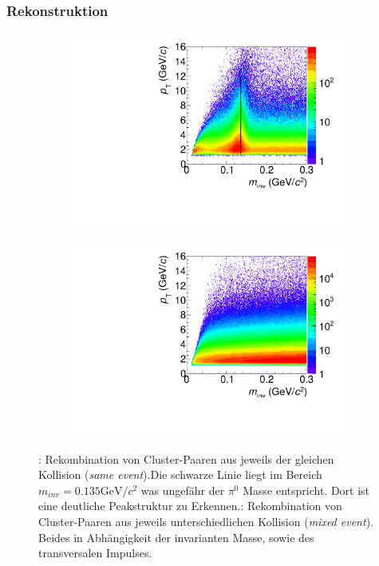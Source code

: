 \documentclass[]{article}
\begin{document}
	
	\subsubsection{Rekonstruktion}
	\begin{figure}[tbp]
		\centering
		\begin{subfigure}{.5\textwidth}
			\centering
			\includegraphics[width=.95\linewidth]{hInvMass_pT_Signal.pdf}
			\caption{}
			\label{figInvMassPt_a}
		\end{subfigure}%
		\begin{subfigure}{.5\textwidth}
			\centering
			\includegraphics[width=.95\linewidth]{hInvMass_pT_Bkg.pdf}
			\caption{}
			\label{figInvMassPt_b}
		\end{subfigure}
		\caption{: Rekombination von Cluster-Paaren aus jeweils der gleichen Kollision ({\it same event}).Die schwarze Linie liegt im Bereich $m_{inv}=0.135\text{GeV/}c^{2}$ was ungef{\"a}hr der $\pi^{0}$ Masse entspricht. Dort ist eine deutliche Peakstruktur zu Erkennen.: Rekombination von Cluster-Paaren aus jeweils unterschiedlichen Kollision ({\it mixed event}). Beides in Abh{\"a}ngigkeit der invarianten Masse, sowie des transversalen Impulses.}
		\label{figInvMassPt}
	\end{figure}
\end{document}
